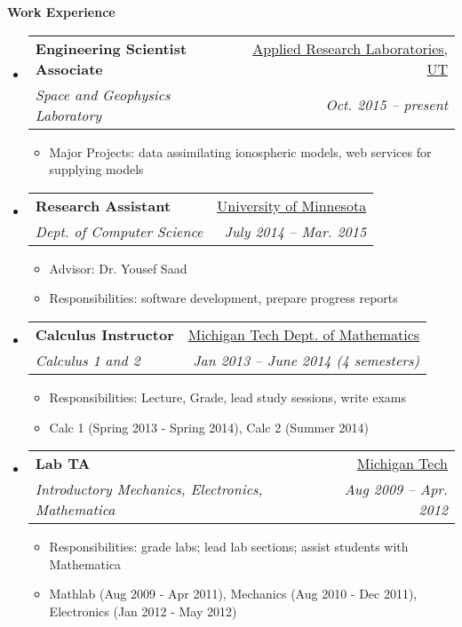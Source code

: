 \documentclass[letterpaper,11pt]{article}
\makeatletter
\newcommand{\resitem}[1]{\item #1 \vspace{-2pt}}
\newcommand{\resheading}[1]{{\large \textbf{#1}}}
\newcommand{\ressubheading}[4]{
\begin{tabular*}{6.5in}{l@{\extracolsep{\fill}}r}
		\textbf{#1} & #2 \\
		\textit{#3} & \textit{#4} \\
\end{tabular*}\vspace{-6pt}}
\makeatother
\begin{document}
\resheading{Work Experience}
\begin{itemize}
\item%
  \ressubheading{Engineering Scientist Associate}{\href{https://www.arlut.utexas.edu}{Applied Research Laboratories, UT}}{Space and Geophysics Laboratory}{Oct. 2015 -- present}
  {\footnotesize
  \begin{itemize}  
    \resitem{Major Projects: data assimilating ionospheric models, web services for supplying models}
  \end{itemize}
  }
\item
  \ressubheading{Research Assistant}{\href{https://www.cs.umn.edu}{University of Minnesota}}{Dept. of Computer Science}{July 2014 -- Mar. 2015}
	{\footnotesize
	\begin{itemize}
    \resitem{Advisor: Dr. Yousef Saad}
		\resitem{Responsibilities: software development, prepare progress reports}
	\end{itemize}
  }
\item%
  \ressubheading{Calculus Instructor}{\href{www.mtu.edu/math/}{Michigan Tech Dept. of Mathematics}}{Calculus 1 and 2}{Jan 2013 -- June 2014 (4 semesters)}
	{\footnotesize
	\begin{itemize}
		\resitem{Responsibilities: Lecture, Grade, lead study sessions, write exams}
    \resitem{Calc 1 (Spring 2013 - Spring 2014), Calc 2 (Summer 2014)}
	\end{itemize}
	}
\item%
  \ressubheading{Lab TA}{\href{www.mtu.edu/physics}{Michigan Tech}}{Introductory Mechanics, Electronics, Mathematica}{Aug 2009 -- Apr. 2012}
	{\footnotesize
	\begin{itemize}
		\resitem{Responsibilities: grade labs; lead lab sections; assist students with Mathematica}
		\resitem{Mathlab (Aug 2009 - Apr 2011), Mechanics (Aug 2010 - Dec 2011), Electronics (Jan 2012 - May 2012)}
	\end{itemize}
	}
\begin{comment}	
\item%
  \ressubheading{MathLab Lab Consultant}{\href{www.mtu.edu/math/}{Michigan Tech Dept. of Mathematical Sciences}}{Calculus 1,2, and 3}{Jan. 2009 -- Apr. 2011}
	{\footnotesize
	\begin{itemize}
		\resitem{8 to 15 hours per week}
	\end{itemize}
	}
\end{comment}
\end{itemize}
\end{document}
